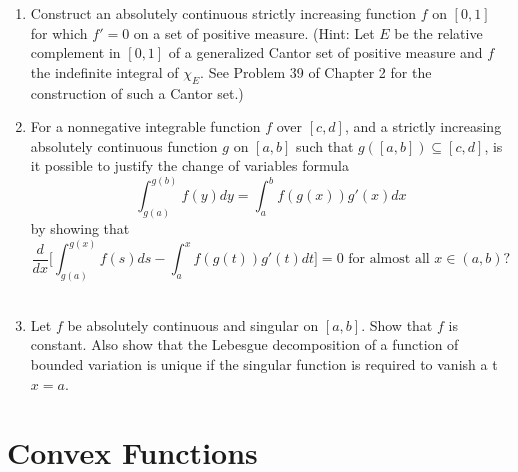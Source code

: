 \begin{enumerate}
    \item Construct an absolutely continuous strictly increasing function $f$ on $[0,1]$ for which $f'=0$ on a set of positive measure.
    (Hint: Let $E$ be the relative complement in $[0,1]$ of a generalized Cantor set of positive measure and $f$ the indefinite integral of $\chi_E$. See Problem 39 of Chapter 2 for the construction of such a Cantor set.)
    \item For a nonnegative integrable function $f$ over $[c,d]$, and a strictly increasing absolutely continuous function $g$ on $[a,b]$ such that $g([a,b])\subseteq [c,d]$, is it possible to justify the change of variables formula
    \[
        \int_{g(a)}^{g(b)}f(y)dy=\int_a^bf(g(x))g'(x)dx  
    \]
    by showing that
    \[
        \frac{d}{dx}\biggl[\int_{g(a)}^{g(x)}f(s)ds-\int_a^xf(g(t))g'(t)dt\biggr]=0\text{ for almost all }x\in(a,b)?  
    \]\
    \item Let $f$ be absolutely continuous and singular on $[a,b]$. Show that $f$ is constant. Also show that the Lebesgue decomposition of a function of bounded variation is unique if the singular function is required to vanish a t $x=a$.
\end{enumerate}

\section{Convex Functions}

